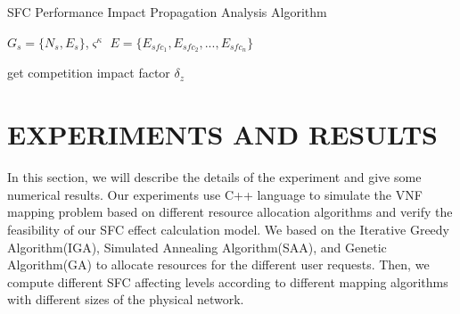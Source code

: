 \documentclass{ieeeaccess}
\begin{document}
\begin{algorithm}
	\caption{SFC Performance Impact Propagation Analysis Algorithm}
	\begin{algorithmic}[1] %
		\Require $G_{s}=\{N_{s},E_{s}\}$,$\varsigma ^{\kappa }$
		\Ensure ${E}=\{{E_{sfc_{1}}},{E_{sfc_{2}}},...,{E_{sfc_{n}}}\}$

		\EndFor

		\State get competition impact factor $\delta_{z}$
		\EndIf
		\EndFor
		\Else
		\EndIf
		\EndFor

		\EndIf
		\EndFor
		\Else
		\EndIf
		\EndFor
		\EndFor
	\end{algorithmic}
\end{algorithm}



\section{EXPERIMENTS AND RESULTS}
In this section, we will describe the details of the experiment and give some numerical results. Our experiments use C++ language to simulate the VNF mapping problem based on different resource allocation algorithms and verify the feasibility of our SFC effect calculation model. We based on the Iterative Greedy Algorithm(IGA), Simulated Annealing Algorithm(SAA), and Genetic Algorithm(GA) to allocate resources for the different user requests. Then, we compute different SFC affecting levels according to different mapping algorithms with different sizes of the physical network.
\end{document}
